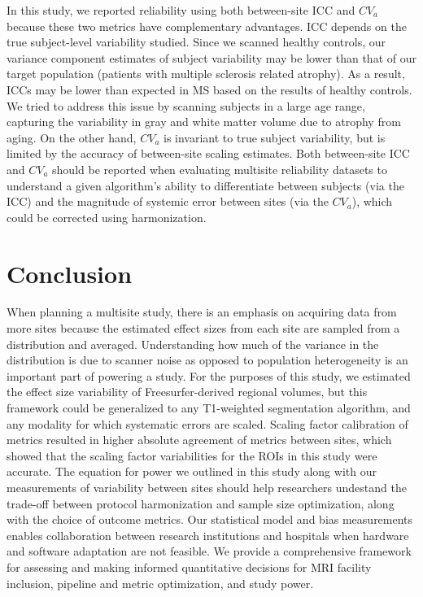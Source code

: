 \documentclass{article}
\begin{document}
In this study, we reported reliability using both between-site ICC and $CV_{a}$ because these two metrics have complementary advantages. ICC depends on the true subject-level variability studied. Since we scanned healthy controls, our variance component estimates of subject variability may be lower than that of our target population (patients with multiple sclerosis related atrophy). As a result, ICCs may be lower than expected in MS based on the results of healthy controls. We tried to address this issue by scanning subjects in a large age range, capturing the variability in gray and white matter volume due to atrophy from aging. On the other hand, $CV_{a}$ is invariant to true subject variability, but is limited by the accuracy of between-site scaling estimates. Both between-site ICC and $CV_{a}$ should be reported when evaluating multisite reliability datasets to understand a given algorithm's ability to differentiate between subjects (via the ICC) and the magnitude of systemic error between sites (via the $CV_{a}$), which could be corrected using harmonization.
\section{Conclusion}
When planning a multisite study, there is an emphasis on acquiring data from more sites because the estimated effect sizes from each site are sampled from a distribution and averaged. Understanding how much of the variance in the distribution is due to scanner noise as opposed to population heterogeneity is an important part of powering a study. For the purposes of this study, we estimated the effect size variability of Freesurfer-derived regional volumes, but this framework could be generalized to any T1-weighted segmentation algorithm, and any modality for which systematic errors are scaled. Scaling factor calibration of metrics resulted in higher absolute agreement of metrics between sites, which showed that the scaling factor variabilities for the ROIs in this study were accurate. The equation for power we outlined in this study along with our measurements of variability between sites should help researchers undestand the trade-off between protocol harmonization and sample size optimization, along with the choice of outcome metrics. Our statistical model and bias measurements enables collaboration between research institutions and hospitals when hardware and software adaptation are not feasible. We provide a comprehensive framework for assessing and making informed quantitative decisions for MRI facility inclusion, pipeline and metric optimization, and study power.
\end{document}
